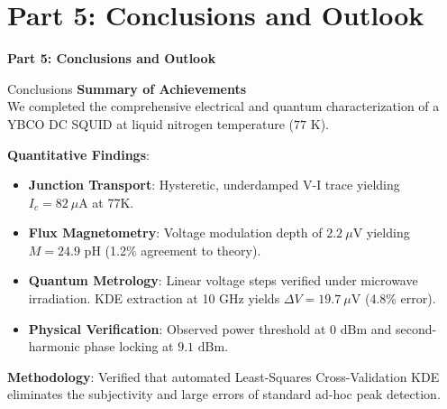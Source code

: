 \documentclass[aspectratio=169]{beamer}
\begin{document}
\section{Part 5: Conclusions and Outlook}
\begin{frame}
    \centering
    \large\bfseries\color{BMEblue}
    Part 5: Conclusions and Outlook
\end{frame}

\begin{frame}{Conclusions}
    \textbf{Summary of Achievements} \\
    We completed the comprehensive electrical and quantum characterization of a YBCO DC SQUID at liquid nitrogen temperature ($77\text{ K}$).
    
    \vspace{0.4cm}
    \textbf{Quantitative Findings}:
    \begin{itemize}
        \item \textbf{Junction Transport}: Hysteretic, underdamped V-I trace yielding $I_c = 82\ \mu\text{A}$ at 77K.
        \item \textbf{Flux Magnetometry}: Voltage modulation depth of $2.2\ \mu\text{V}$ yielding $M = 24.9\text{ pH}$ (1.2\% agreement to theory).
        \item \textbf{Quantum Metrology}: Linear voltage steps verified under microwave irradiation. KDE extraction at 10 GHz yields $\Delta V = 19.7\ \mu\text{V}$ (4.8\% error).
        \item \textbf{Physical Verification}: Observed power threshold at $0\text{ dBm}$ and second-harmonic phase locking at $9.1\text{ dBm}$.
    \end{itemize}
    
    \vspace{0.4cm}
    \textbf{Methodology}: Verified that automated Least-Squares Cross-Validation KDE eliminates the subjectivity and large errors of standard ad-hoc peak detection.
\end{frame}
\end{document}
